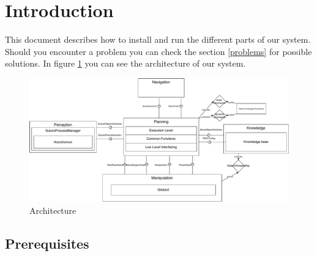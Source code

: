 \documentclass[main.tex]{subfiles}
\begin{document}
\newpage
	\section{Introduction}
	This document describes how to install and run the different parts of our system.\\
	Should you encounter a problem you can check the section \ref{problems} for possible solutions.
	In figure \ref{fig:architecture} you can see the architecture of our system.
	\begin{figure}[h]
\centering
\includegraphics[width=1.0\textwidth]{architecture/overview}
\caption{Architecture}
\label{fig:architecture}
\end{figure}
	
	\subsection{Prerequisites}
	
\end{document}
